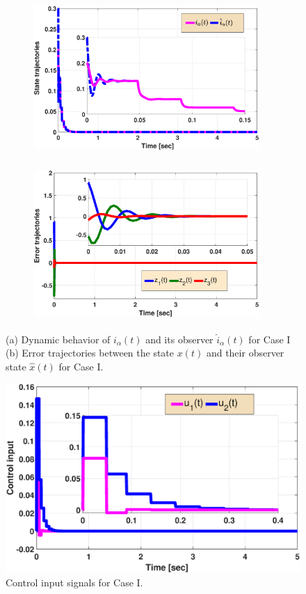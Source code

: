 \documentclass[preprint,11pt]{elsarticle}
\begin{document}
    \begin{figure}[!ht]
    \begin{subfigure}[b]{0.5\textwidth}
    \centerline{\includegraphics[width=8.6cm,height=5.8cm]{x3.eps}}
    \caption{ }
    \end{subfigure}
    \begin{subfigure}[b]{0.5\textwidth}
    \centerline{\includegraphics[width=8.6cm,height=5.8cm]{z1.eps}}
    \caption{ }
    \end{subfigure}
    \caption{(a) Dynamic behavior of $i_\alpha(t)$ and its observer $\hat{i}_\alpha(t)$ for Case I  (b) Error trajectories between the state $x(t)$ and their observer state $\hat{x}(t)$ for Case I.} \label{F2}
\centering
  \includegraphics[height=5.8 cm,width=11.5cm]{u.eps}
\caption{Control input signals for Case I.}
\label{F5}
\vspace{-0.2cm}
\end{figure}
\end{document}
